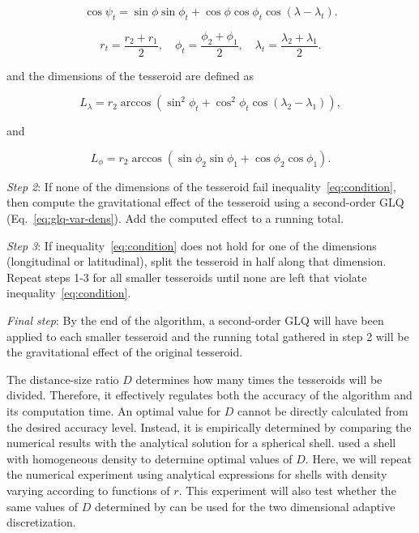 \documentclass[extra, referee]{gji}
\begin{document}
\begin{equation}
    \cos\psi_t =
        \sin\phi\sin\phi_t + \cos\phi\cos\phi_t\cos(\lambda - \lambda_t).
\end{equation}

\begin{equation}
    r_t = \frac{r_2 + r_1}{2}, \quad
    \phi_t = \frac{\phi_2 + \phi_1}{2}, \quad
    \lambda_t = \frac{\lambda_2 + \lambda_1}{2}.
\end{equation}

\noindent
and the dimensions of the tesseroid are defined as

\begin{equation}
    L_\lambda = r_2 \arccos(\sin^2\phi_t +
        \cos^2\phi_t\cos(\lambda_2 - \lambda_1)),
    \label{eq:sizelon}
\end{equation}

\noindent and

\begin{equation}
    L_\phi = r_2 \arccos(\sin\phi_2\sin\phi_1 + \cos\phi_2\cos\phi_1).
\end{equation}

\textit{Step 2}:
If none of the dimensions of the tesseroid fail inequality~\ref{eq:condition}, then
compute the gravitational effect of the tesseroid using a second-order GLQ
(Eq.~\ref{eq:glq-var-dens}).
Add the computed effect to a running total.

\textit{Step 3}:
If inequality~\ref{eq:condition} does not hold for one of the dimensions
(longitudinal or latitudinal), split the tesseroid in half along that dimension.
Repeat steps 1-3 for all smaller tesseroids until none are left that violate
inequality~\ref{eq:condition}.

\textit{Final step}:
By the end of the algorithm, a second-order GLQ will have been applied to each smaller
tesseroid and the running total gathered in step 2 will be the gravitational effect of
the original tesseroid.

The distance-size ratio $D$ determines how many times the tesseroids will be divided.
Therefore, it effectively regulates both the accuracy of the algorithm and its
computation time.
An optimal value for $D$ cannot be directly calculated from the desired accuracy level.
Instead, it is empirically determined by comparing the numerical results with the
analytical solution for a spherical shell.
\citet{Uieda2016} used a shell with homogeneous density to determine optimal values of
$D$.
Here, we will repeat the numerical experiment using analytical expressions for shells
with density varying according to functions of $r$.
This experiment will also test whether the same values of $D$ determined by
\citet{Uieda2016} can be used for the two dimensional adaptive discretization.
\end{document}
